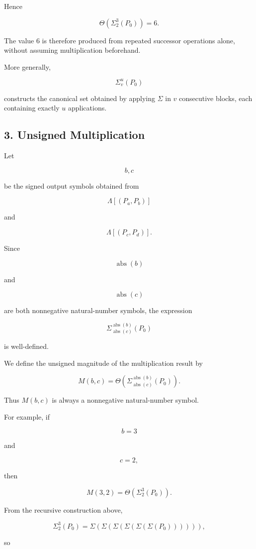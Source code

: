 \documentclass[12pt]{article}
\begin{document}
Hence

\[
\Theta\left(\Sigma^3_2(P_0)\right)=6.
\]

The value \(6\) is therefore produced from repeated successor operations alone, without assuming multiplication beforehand.

More generally,

\[
\Sigma^u_v(P_0)
\]

constructs the canonical set obtained by applying \(\Sigma\) in \(v\) consecutive blocks, each containing exactly \(u\) applications.

\subsection*{3. Unsigned Multiplication}

Let

\[
b,c
\]

be the signed output symbols obtained from

\[
\Lambda[(P_a,P_b)]
\]

and

\[
\Lambda[(P_c,P_d)].
\]

Since

\[
\operatorname{abs}(b)
\]

and

\[
\operatorname{abs}(c)
\]

are both nonnegative natural-number symbols, the expression

\[
\Sigma^{\operatorname{abs}(b)}_{\operatorname{abs}(c)}(P_0)
\]

is well-defined.

We define the unsigned magnitude of the multiplication result by

\[
\boxed{
M(b,c)
=
\Theta\left(
\Sigma^{\operatorname{abs}(b)}_{\operatorname{abs}(c)}
(P_0)
\right).
}
\]

Thus \(M(b,c)\) is always a nonnegative natural-number symbol.

For example, if

\[
b=3
\]

and

\[
c=2,
\]

then

\[
M(3,2)
=
\Theta\left(
\Sigma^3_2(P_0)
\right).
\]

From the recursive construction above,

\[
\Sigma^3_2(P_0)
=
\Sigma(\Sigma(\Sigma(\Sigma(\Sigma(\Sigma(P_0)))))),
\]

so
\end{document}
